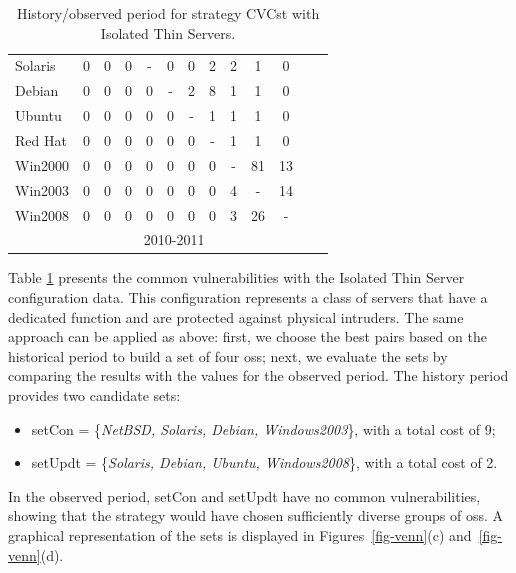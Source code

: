 \begin{table}[!ht]
\begin{center}
{\begin{tabular}{|l|c|c|c|c|c|c|c|c|c|c|c|c|}
Solaris & 0 & 0 & 0 & - & 0 & 0 & 2 & 2 & 1 & 0& \\ \cline{1-11}
Debian & 0 & 0 & 0 & 0 & - & 2 & 8 & 1 & 1 & 0 &\\ \cline{1-11}
Ubuntu & 0 & 0 & 0 & 0 & 0 & - & 1 & 1 & 1 & 0 &\\ \cline{1-11}
Red Hat & 0 & 0 & 0 & 0 & 0 & 0 & - & 1 & 1 & 0 &\\ \cline{1-11}
Win2000 & 0 & 0 & 0 & 0 & 0 & 0 & 0 & - & 81 & 13 &\\ \cline{1-11}
Win2003 & 0 & 0 & 0 & 0 & 0 & 0 & 0 & 4 & - & 14 &\\ \cline{1-12}
Win2008 & 0 & 0 & 0 & 0 & 0 & 0 & 0 & 3 & 26 & - & \multicolumn{1}{|c}{}  \\ \cline{1-11}
 \multicolumn{1}{c|}{}& \multicolumn{9}{|c|}{2010-2011} & \multicolumn{2}{|c}{}\\ \cline{2-10}
\end{tabular}
\caption{History/observed period for strategy CVCst with Isolated Thin Servers.}
\label{tab:strat_i_iso}
}
\end{center}
\end{table}


Table \ref{tab:strat_i_iso} presents the common vulnerabilities with the Isolated Thin Server configuration data. This configuration represents a class of servers that have a dedicated function and are protected against physical intruders. 
The same approach can be applied as above: first, we choose the best pairs based on the historical period to build a set of four \glspl{os}; next, we evaluate the sets by comparing the results with the values for the observed period. 
The history period provides two candidate sets: 

\begin{itemize}
\item setCon = \{\emph{NetBSD, Solaris, Debian, Windows2003}\}, with a total cost of 9;
\item setUpdt = \{\emph{Solaris, Debian, Ubuntu, Windows2008}\}, with a total cost of 2.
\end{itemize}

In the observed period, setCon and setUpdt have no common vulnerabilities, showing that the strategy would have chosen sufficiently diverse groups of \glspl{os}. A graphical representation of the sets is displayed in Figures~\ref{fig-venn}(c) and~\ref{fig-venn}(d).

